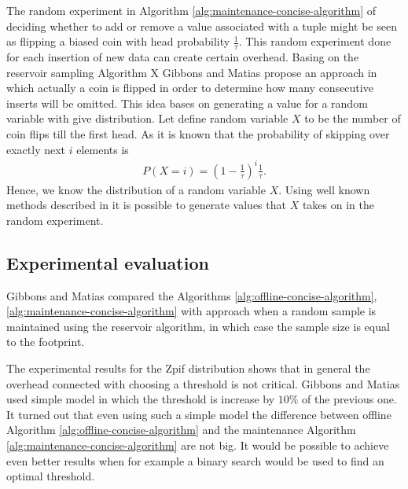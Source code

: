 The random experiment in Algorithm
\ref{alg:maintenance-concise-algorithm} of deciding whether to add or remove a value associated
with a tuple might be seen as flipping a biased coin with head
probability $\frac{1}{\tau}$. This random experiment done for
each insertion of new data can create certain overhead. Basing on the
reservoir sampling Algorithm X \cite{Vit85} Gibbons and Matias propose
an approach in which actually a coin is flipped in order to determine how many
consecutive inserts will be omitted. This idea bases on generating a value for a random
variable with give distribution. Let define random variable $X$ to
be the number of coin flips till the first head. As it is known that the probability
of skipping over exactly next $i$ elements is
\begin{align*}
P(X = i) = \left( 1 - \frac{1}{\tau}\right)^i\frac{1}{\tau}.
\end{align*}
Hence, we know the distribution of a random variable $X$. Using
well known methods described in \cite{Vit85} it is possible to
generate values that $X$ takes on in the random experiment.

\subsection{Experimental evaluation}
Gibbons and Matias \cite{GM98} compared the Algorithms
\ref{alg:offline-concise-algorithm}, \ref{alg:maintenance-concise-algorithm} with approach
when a random sample is maintained using the reservoir
algorithm, in which case the sample size is equal to the footprint.

The experimental results for the Zpif distribution shows that in
general the overhead connected with choosing a threshold is not
critical. Gibbons and Matias \cite{GM98} used simple model in which
the threshold is increase by $10\%$ of the previous one. It turned out
that even using such a simple model the difference between offline
Algorithm \ref{alg:offline-concise-algorithm} and the maintenance
Algorithm \ref{alg:maintenance-concise-algorithm} are not
big. It would be possible to achieve even better results when for
example a binary search would be used to find an optimal
threshold. 
